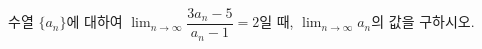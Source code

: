 수열 $\{a_n\}$에 대하여 $\displaystyle\lim_{n\to\infty}\dfrac{3a_n-5}{a_n-1}=2$일 때, $\displaystyle\lim_{n\to\infty}a_n$의 값을 구하시오.
